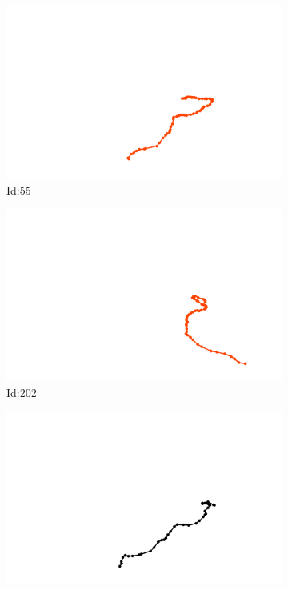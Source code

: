 \documentclass[12pt,twoside]{report}
\begin{document}
\begin{figure}
\centering
\begin{subfigure}[b]{0.20\textwidth}
\centering
\includegraphics[width=\textwidth]{../../trajectories/55.png}
\caption{Id:55}
\end{subfigure}
\begin{subfigure}[b]{0.20\textwidth}
\centering
\includegraphics[width=\textwidth]{../../trajectories/202.png}
\caption{Id:202}
\end{subfigure}
\begin{subfigure}[b]{0.20\textwidth}
\centering
\includegraphics[width=\textwidth]{../../trajectories/570.png}

\end{subfigure}
\end{figure}
\end{document}
